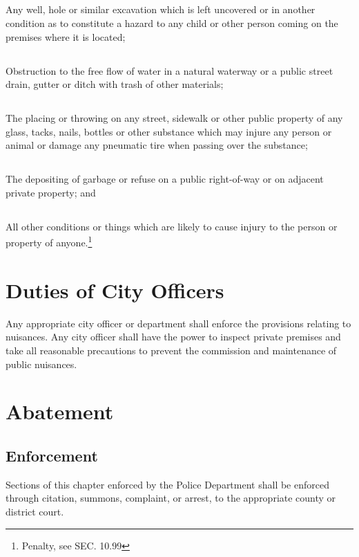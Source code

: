 \subsection{}
 Any well, hole or similar excavation which is left uncovered or in another condition as to constitute a hazard to any child or other person coming on the premises where it is located;
\subsection{}
 Obstruction to the free flow of water in a natural waterway or a public street drain, gutter or ditch with trash of other materials;
\subsection{}
 The placing or throwing on any street, sidewalk or other public property of any glass, tacks, nails, bottles or other substance which may injure any person or animal or damage any pneumatic tire when passing over the substance;
\subsection{}
 The depositing of garbage or refuse on a public right-of-way or on adjacent private property; and
\subsection{}
 All other conditions or things which are likely to cause injury to the person or property of anyone.\footnote{Penalty, see SEC. 10.99}

\section{Duties of City Officers}
Any appropriate city officer or department shall enforce the provisions relating to nuisances.  Any city officer shall have the power to inspect private premises and take all reasonable precautions to prevent the commission and maintenance of public nuisances.

\section{Abatement}
\subsection{Enforcement}
Sections of this chapter enforced by the Police Department shall be enforced through citation, summons, complaint, or arrest, to the appropriate county or district court.
